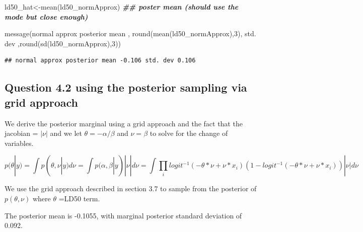 \documentclass[
]{book}
\newenvironment{Shaded}{\begin{snugshade}}{\end{snugshade}}
\newcommand{\DecValTok}[1]{\textcolor[rgb]{0.00,0.00,0.81}{#1}}
\newcommand{\DocumentationTok}[1]{\textcolor[rgb]{0.56,0.35,0.01}{\textbf{\textit{#1}}}}
\newcommand{\FunctionTok}[1]{\textcolor[rgb]{0.00,0.00,0.00}{#1}}
\newcommand{\NormalTok}[1]{#1}
\newcommand{\OtherTok}[1]{\textcolor[rgb]{0.56,0.35,0.01}{#1}}
\newcommand{\StringTok}[1]{\textcolor[rgb]{0.31,0.60,0.02}{#1}}
\theoremstyle{definition}
\theoremstyle{definition}
\theoremstyle{definition}
\theoremstyle{definition}
\theoremstyle{remark}
\begin{document}
\begin{Shaded}
\begin{Highlighting}[]
\NormalTok{ ld50\_hat}\OtherTok{\textless{}{-}}\FunctionTok{mean}\NormalTok{(ld50\_normApprox)  }\DocumentationTok{\#\# poster mean (should use the mode but close enough)}
 
 \FunctionTok{message}\NormalTok{(}\StringTok{\textquotesingle{}normal approx posterior mean \textquotesingle{}}\NormalTok{, }\FunctionTok{round}\NormalTok{(}\FunctionTok{mean}\NormalTok{(ld50\_normApprox),}\DecValTok{3}\NormalTok{),}\StringTok{\textquotesingle{} std. dev \textquotesingle{}}\NormalTok{,}\FunctionTok{round}\NormalTok{(}\FunctionTok{sd}\NormalTok{(ld50\_normApprox),}\DecValTok{3}\NormalTok{))}
\end{Highlighting}
\end{Shaded}

\begin{verbatim}
## normal approx posterior mean -0.106 std. dev 0.106
\end{verbatim}

\hypertarget{question-4.2-using-the-posterior-sampling-via-grid-approach}{%
\subsection{Question 4.2 using the posterior sampling via grid approach}\label{question-4.2-using-the-posterior-sampling-via-grid-approach}}

We derive the posterior marginal using a grid approach and the fact that the jacobian = \(|\nu|\) and we let \(\theta= -\alpha/\beta\) and \(\nu=\beta\) to solve for the change of variables.

\[
p(\theta|y) = \int p(\theta,\nu|y)d\nu = \int p(\alpha,\beta|y)|\nu|d\nu 
=\int \prod_i logit^{-1}(-\theta*\nu+\nu*x_i)(1-logit^{-1}(-\theta*\nu+\nu*x_i))|\nu|d\nu
\]

We use the grid approach described in section 3.7 to sample from the posterior of \(p(\theta,\nu)\) where \(\theta\) =LD50 term.

The posterior mean is -0.1055, with marginal posterior standard deviation of 0.092.
\end{document}
